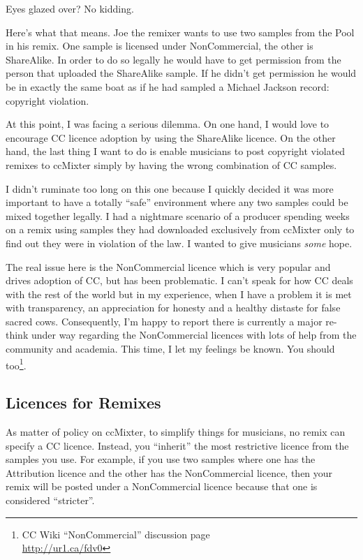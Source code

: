 Eyes glazed over? No kidding.

Here's what that means. Joe the remixer wants to use two samples from the Pool
in his remix. One sample is licensed under NonCommercial, the other is
ShareAlike. In order to do so legally he would have to get permission from the
person that uploaded the ShareAlike sample. If he didn't get permission he would
be in exactly the same boat as if he had sampled a Michael Jackson record:
copyright violation.

At this point, I was facing a serious dilemma. On one hand, I would love to
encourage CC licence adoption by using the ShareAlike licence. On the other
hand, the last thing I want to do is enable musicians to post copyright violated
remixes to ccMixter simply by having the wrong combination of CC samples.

I didn't ruminate too long on this one because I quickly decided it was more
important to have a totally ``safe'' environment where any two samples could be
mixed together legally. I had a nightmare scenario of a producer spending weeks
on a remix using samples they had downloaded exclusively from ccMixter only to
f\hbox{}ind out they were in violation of the law. I wanted to give musicians
\textit{some} hope.

The real issue here is the NonCommercial licence which is very popular and
drives adoption of CC, but has been problematic. I can't speak for how CC deals
with the rest of the world but in my experience, when I have a problem it is met
with transparency, an appreciation for honesty and a healthy distaste for false
sacred cows. Consequently, I'm happy to report there is currently a major
re-think under way regarding the NonCommercial licences with lots of help from
the community and academia. This time, I let my feelings be known. You should
too\footnote{CC Wiki ``NonCommercial'' discussion page\\
\url{http://ur1.ca/fdv0}}.


\subsection{Licences for Remixes}
\label{ss:unexpected_collaboration:license:licenses_for_remixes}

As matter of policy on ccMixter, to simplify things for musicians, no remix can
specify a CC licence. Instead, you ``inherit'' the most restrictive licence from
the samples you use. For example, if you use two samples where one has the
Attribution licence and the other has the NonCommercial licence, then your remix
will be posted under a NonCommercial licence because that one is considered
``stricter''.


